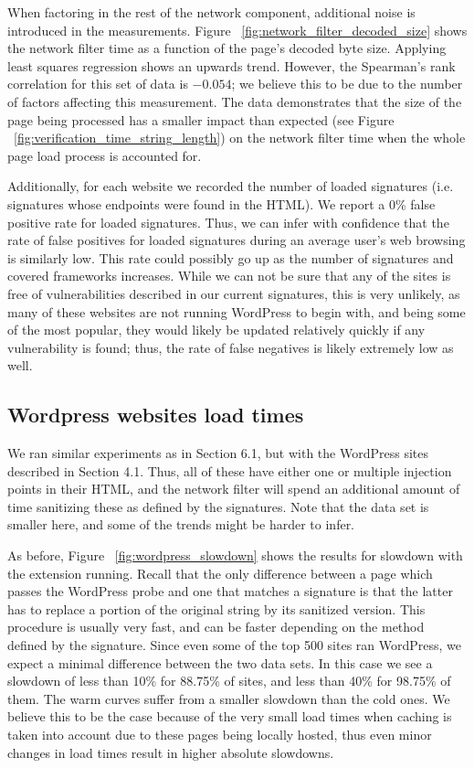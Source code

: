 When factoring in the rest of the network component, additional noise is introduced in the measurements. Figure ~\ref{fig:network_filter_decoded_size} shows the network filter time as a function of the page's decoded byte size. Applying least squares regression shows an upwards trend. However, the Spearman's rank correlation for this set of data is $-0.054$; we believe this to be due to the number of factors affecting this measurement. The data demonstrates that the size of the page being processed has a smaller impact than expected (see Figure ~\ref{fig:verification_time_string_length}) on the network filter time when the whole page load process is accounted for.


Additionally, for each website we recorded the number of loaded signatures (i.e. signatures whose endpoints were found in the HTML). We report a 0\% false positive rate for loaded signatures. Thus, we can infer with confidence that the rate of false positives for loaded signatures during an average user's web browsing is similarly low. This rate could possibly go up as the number of signatures and covered frameworks increases. While we can not be sure that any of the sites is free of vulnerabilities described in our current signatures, this is very unlikely, as many of these websites are not running WordPress to begin with, and being some of the most popular, they would likely be updated relatively quickly if any vulnerability is found; thus, the rate of false negatives is likely extremely low as well.

\subsection{Wordpress websites load times}

We ran similar experiments as in Section 6.1, but with the WordPress sites described in Section 4.1. Thus, all of these have either one or multiple injection points in their HTML, and the network filter will spend an additional amount of time sanitizing these as defined by the signatures. Note that the data set is smaller here, and some of the trends might be harder to infer. 

As before, Figure ~\ref{fig:wordpress_slowdown} shows the results for slowdown with the extension running. Recall that the only difference between a page which passes the WordPress probe and one that matches a signature is that the latter has to replace a portion of the original string by its sanitized version. This procedure is usually very fast, and can be faster depending on the method defined by the signature. Since even some of the top 500 sites ran WordPress, we expect a minimal difference between the two data sets. In this case we see a slowdown of less than 10\% for 88.75\% of sites, and less than 40\% for 98.75\% of them. The warm curves suffer from a smaller slowdown than the cold ones. We believe this to be the case because of the very small load times when caching is taken into account due to these pages being locally hosted, thus even minor changes in load times result in higher absolute slowdowns.

